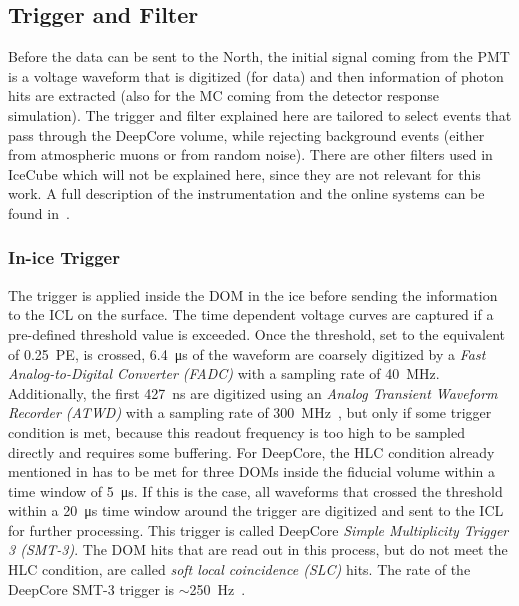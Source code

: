 \subsection{Trigger and Filter} 

Before the data can be sent to the North, the initial signal coming from the PMT is a voltage waveform that is digitized (for data) and then information of photon hits are extracted (also for the MC coming from the detector response simulation). The trigger and filter explained here are tailored to select events that pass through the DeepCore volume, while rejecting background events (either from atmospheric muons or from random noise). There are other filters used in IceCube which will not be explained here, since they are not relevant for this work. A full description of the instrumentation and the online systems can be found in~.


\subsubsection{In-ice Trigger} 

The trigger is applied inside the DOM in the ice before sending the information to the ICL on the surface. The time dependent voltage curves are captured if a pre-defined threshold value is exceeded. Once the threshold, set to the equivalent of \SI{0.25}{PE}, is crossed, \SI{6.4}{\micro\second} of the waveform are coarsely digitized by a \textit{Fast Analog-to-Digital Converter (FADC)} with a sampling rate of \SI{40}{\mega\hertz}. Additionally, the first \SI{427}{\nano\second} are digitized using an \textit{Analog Transient Waveform Recorder (ATWD)} with a sampling rate of \SI{300}{\mega\hertz}~, but only if some trigger condition is met, because this readout frequency is too high to be sampled directly and requires some buffering. For DeepCore, the HLC condition already mentioned in  has to be met for three DOMs inside the fiducial volume within a time window of \SI{5}{\micro\second}. If this is the case, all waveforms that crossed the threshold within a \SI{20}{\micro\second} time window around the trigger are digitized and sent to the ICL for further processing. This trigger is called DeepCore \textit{Simple Multiplicity Trigger 3 (SMT-3)}. The DOM hits that are read out in this process, but do not meet the HLC condition, are called \textit{soft local coincidence (SLC)} hits. The rate of the DeepCore SMT-3 trigger is $\sim$\SI{250}{\hertz}~\cite{2017JInst..12P3012A_Instrumentation_Systems}.


